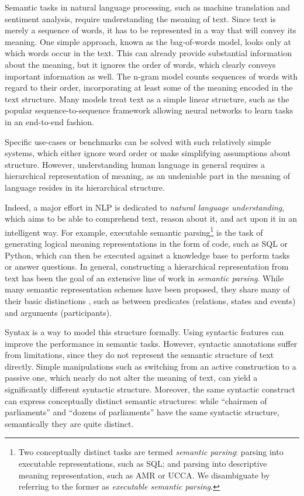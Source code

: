 \documentclass[12pt,a4paper]{report}
\begin{document}
Semantic tasks in natural language processing, such as machine translation and
sentiment analysis, require understanding the meaning of text. Since text is
merely a sequence of words, it has to be represented in a way that will convey
its meaning. One simple approach, known as the bag-of-words model, looks only
at which words occur in the text.
This can already provide
substantial information about the meaning, but it ignores the order of words,
which clearly conveys important information as well. The n-gram model counts
sequences of words with regard to their order, incorporating at least some of
the meaning encoded in the text structure.
Many models treat text as a simple linear structure,
such as the popular sequence-to-sequence framework allowing neural networks
to learn tasks in an end-to-end fashion.

Specific use-cases or benchmarks can be solved with such relatively simple
systems, which either ignore word order or make simplifying assumptions about structure.
However, understanding human language in general
requires a hierarchical representation of meaning,
as an undeniable part in the
meaning of language resides in its hierarchical structure.

Indeed, a major effort in NLP is dedicated to \textit{natural language understanding},
which aims to be able to comprehend text, reason about it, and act upon it
in an intelligent way.
For example, executable semantic parsing\footnote{Two conceptually distinct
tasks are termed \textit{semantic parsing}: parsing into
executable representations, such as SQL; and parsing into descriptive meaning
representation, such as AMR or UCCA.
We disambiguate by referring to the former as \textit{executable semantic parsing}.}
is the task of generating logical meaning representations in the form of code, such as
SQL or Python, which can then be executed against a knowledge base to perform
tasks or answer questions.
In general, constructing a hierarchical representation from text has been the
goal of an extensive line of work in \textit{semantic parsing}.
While many semantic representation schemes have been proposed,
they share many of their basic distinctions \citep{abend2017state},
such as between predicates
(relations, states and events) and arguments (participants).

Syntax is a way to
model this structure formally. Using syntactic features can improve the
performance in semantic tasks.
However, syntactic annotations suffer from limitations, since they do not
represent the semantic structure of text directly. Simple manipulations such as
switching from an active construction to a passive one, which nearly do not
alter the meaning of text, can yield a significantly different syntactic
structure. Moreover, the same syntactic construct can express conceptually
distinct semantic structures: while ``chairmen of parliaments'' and
``dozens of parliaments'' have the same syntactic structure, semantically
they are quite distinct.
\end{document}
